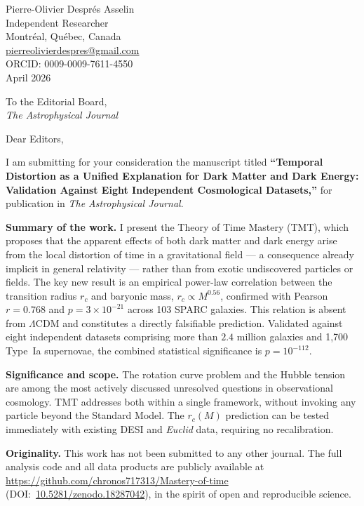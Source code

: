 \documentclass[12pt]{article}
\begin{document}
\begin{flushright}
  Pierre-Olivier Despr\'{e}s Asselin \\
  Independent Researcher \\
  Montr\'{e}al, Qu\'{e}bec, Canada \\
  \href{mailto:pierreolivierdespres@gmail.com}{pierreolivierdespres@gmail.com} \\
  ORCID: 0009-0009-7611-4550 \\[6pt]
  April 2026
\end{flushright}

\bigskip

\noindent
To the Editorial Board, \\
\textit{The Astrophysical Journal}

\bigskip

Dear Editors,

I am submitting for your consideration the manuscript titled
\textbf{``Temporal Distortion as a Unified Explanation for Dark Matter
and Dark Energy: Validation Against Eight Independent Cosmological
Datasets,''} for publication in \textit{The Astrophysical Journal}.

\textbf{Summary of the work.}
I present the Theory of Time Mastery (TMT), which proposes that the
apparent effects of both dark matter and dark energy arise from the
local distortion of time in a gravitational field --- a consequence
already implicit in general relativity --- rather than from exotic
undiscovered particles or fields.  The key new result is an empirical
power-law correlation between the transition radius $r_c$ and baryonic
mass, $r_c \propto M^{0.56}$, confirmed with Pearson $r = 0.768$ and
$p = 3\times10^{-21}$ across 103 SPARC galaxies.  This relation is
absent from $\Lambda$CDM and constitutes a directly falsifiable
prediction.  Validated against eight independent datasets comprising
more than $2.4$ million galaxies and 1,700 Type~Ia supernovae, the
combined statistical significance is $p = 10^{-112}$.

\textbf{Significance and scope.}
The rotation curve problem and the Hubble tension are among the most
actively discussed unresolved questions in observational cosmology.
TMT addresses both within a single framework, without invoking any
particle beyond the Standard Model.  The $r_c(M)$ prediction can be
tested immediately with existing DESI and \textit{Euclid} data,
requiring no recalibration.

\textbf{Originality.}
This work has not been submitted to any other journal.  The full
analysis code and all data products are publicly available at
\url{https://github.com/chronos717313/Mastery-of-time}
(DOI:~\href{https://doi.org/10.5281/zenodo.18287042}{10.5281/zenodo.18287042}),
in the spirit of open and reproducible science.
\end{document}
